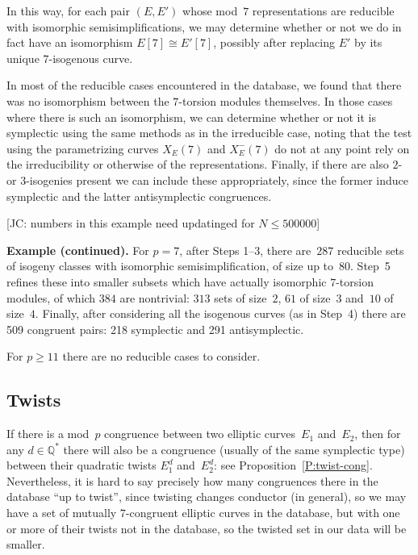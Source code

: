 \documentclass[12pt, reqno]{amsart}
\newcommand{\Q}{\mathbb{Q}}
\numberwithin{equation}{section}
\theoremstyle{definition}
\theoremstyle{remark}
\newcommand{\jc}[1]{{\color{darkgreen} \textsf{[JC: #1]}}}
\begin{document}

In this way, for each pair $(E,E')$ whose 
mod~$7$ representations
are reducible with isomorphic semisimplifications, we may determine
whether or not we do in fact have an isomorphism $E[7]\cong E'[7]$,
possibly after replacing $E'$ by its unique $7$-isogenous curve.

In most of the reducible cases encountered in the database, we found
that there was no isomorphism between the $7$-torsion modules
themselves.  In those cases where there is such an isomorphism, we can
determine whether or not it is symplectic using the same methods as in
the irreducible case, noting that the test using the parametrizing
curves $X_E(7)$ and $X_E^-(7)$ do not at any point rely on the
irreducibility or otherwise of the representations.  Finally, if there
are also $2$-{} or $3$-isogenies present we can include these
appropriately, since the former induce symplectic and the latter
antisymplectic congruences.

\jc{numbers in this example need updatinged for $N\le500000$}

{\bf Example (continued).} For $p=7$, after Steps 1--3, there
are~$287$ reducible sets of isogeny classes with isomorphic
semisimplification, of size up to~$80$.  Step~5 refines these into
smaller subsets which have actually isomorphic $7$-torsion modules, of
which $384$ are nontrivial: $313$ sets of size~$2$, $61$ of size~$3$
and~$10$ of size~$4$.  Finally, after considering all the isogenous
curves (as in Step~4) there are 509 congruent pairs: 218 symplectic
and 291 antisymplectic.

For $p\ge11$ there are no reducible cases to consider.

\subsection{Twists}
If there is a mod~$p$ congruence between two elliptic curves~$E_1$
and~$E_2$, then for any $d\in\Q^*$ there will also be a congruence
(usually of the same symplectic type) between their quadratic twists
$E_1^d$ and~$E_2^d$: see Proposition~\ref{P:twist-cong}.
Nevertheless, it is hard to say precisely how many congruences there
in the database ``up to twist'', since twisting changes conductor (in
general), so we may have a set of mutually $7$-congruent elliptic
curves in the database, but with one or more of their twists not in
the database, so the twisted set in our data will be smaller.
\end{document}

